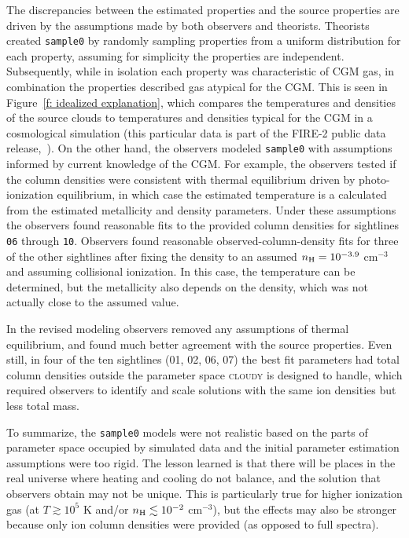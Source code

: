 \documentclass[fleqn,usenatbib]{mnras}
\begin{document}
The discrepancies between the estimated properties and the source properties are driven by the assumptions made by both observers and theorists.
Theorists created \texttt{sample0} by randomly sampling properties from a uniform distribution for each property, assuming for simplicity the properties are independent.
Subsequently, while in isolation each property was characteristic of CGM gas, in combination the properties described gas atypical for the CGM.
This is seen in Figure~\ref{f: idealized explanation}, which compares the temperatures and densities of the source clouds to temperatures and densities typical for the CGM in a cosmological simulation (this particular data is part of the FIRE-2 public data release,~\citealt{wetzel2022Public}).
On the other hand, the observers modeled \texttt{sample0} with assumptions informed by current knowledge of the CGM.
For example, the observers tested if the column densities were consistent with thermal equilibrium driven by photo-ionization equilibrium, in which case the estimated temperature is a calculated from the estimated metallicity and density parameters.
Under these assumptions the observers found reasonable fits to the provided column densities for sightlines \texttt{06} through \texttt{10}.
Observers found reasonable observed-column-density fits for three of the other sightlines after fixing the density to an assumed $n_{\rm H} = 10^{-3.9}$ cm$^{-3}$ and assuming collisional ionization.
In this case, the temperature can be determined, but the metallicity also depends on the density,
which was not actually close to the assumed value.

In the revised modeling observers removed any assumptions of thermal equilibrium, and found much better agreement with the source properties.
Even still, in four of the ten sightlines (\textsc{01}, \textsc{02}, \textsc{06}, \textsc{07}) the best fit parameters had total  column densities outside the parameter space \textsc{cloudy} is designed to handle, which required observers to identify and scale solutions with the same ion densities but less total mass.

To summarize,
the \texttt{sample0} models were not realistic based on the parts of parameter space occupied by simulated data and the initial parameter estimation assumptions were too rigid.
The lesson learned is that there will be places in the real universe where heating and cooling do not balance, and the solution that observers obtain may not be unique.
This is particularly true for higher ionization gas (at $T \gtrsim 10^{5}$ K and/or $n_{\rm H} \lesssim 10^{-2}$ cm$^{-3}$),
but the effects may also be stronger because only ion column densities were provided (as opposed to full spectra).
\end{document}
